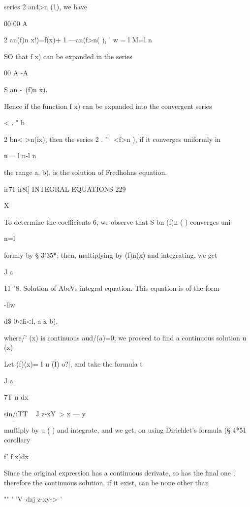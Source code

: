 {series 2 an4>n (1), we have 

00 00 A 

2 an(f)n x!)=f(x)+ 1 —an(f>n( ), ' 
w = l M=l  n 

SO that f x) can be expanded in the series 

00 A -A 

S an -\ (f)n  x). 

Hence if the function f x) can be expanded into the convergent series 

<  . "  b \ 

2 bn< >n(ix), then the series 2   . "  \ <f>n  ), if it converges uniformly in 

n = l n-l  n   

the range  a, b), is the solution of Fredhohns equation. 



ir71-ir8l] INTEGRAL EQUATIONS 229 

X 

To determine the coefficients 6,  we observe that S bn (f)n ( ) converges uni- 

n=l 

formly by § 3'35*; then, multiplying by (f)n(x) and integrating, we get 

J a 



11 "8. Solution of AbeVs integral equation. 
This equation is of the form 



  -llw 



d\$  0<fi<l, a x b), 



where/' (x) is continuous aud/(a)=0; we proceed to find a continuous solution u (x) 



Let (f)(x)= I u (I) o?|, and take the formula t 

J a 

7T n dx 

sin/iTT ~ J    z-xY~>  x —  y 



multiply by u ( ) and integrate, and we get, on using Dirichlet's formula (§ 4*51 corollary\ 

  f' f x)dx  

Since the original expression has a continuous derivate, so has the final one ; therefore the 
continuous solution, if it exist, can be none other than 

"" '  'V~dzj  z-xy-> ' 

}

